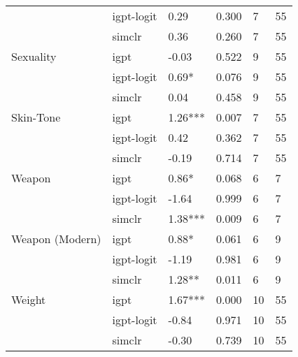 \begin{tabular}{llllll}
       & igpt-logit &     0.29 &  0.300 &     7 &    55 \\
       & simclr &     0.36 &  0.260 &     7 &    55 \\
Sexuality & igpt &    -0.03 &  0.522 &     9 &    55 \\
       & igpt-logit &    0.69* &  0.076 &     9 &    55 \\
       & simclr &     0.04 &  0.458 &     9 &    55 \\
Skin-Tone & igpt &  1.26*** &  0.007 &     7 &    55 \\
       & igpt-logit &     0.42 &  0.362 &     7 &    55 \\
       & simclr &    -0.19 &  0.714 &     7 &    55 \\
Weapon & igpt &    0.86* &  0.068 &     6 &     7 \\
       & igpt-logit &    -1.64 &  0.999 &     6 &     7 \\
       & simclr &  1.38*** &  0.009 &     6 &     7 \\
Weapon (Modern) & igpt &    0.88* &  0.061 &     6 &     9 \\
       & igpt-logit &    -1.19 &  0.981 &     6 &     9 \\
       & simclr &   1.28** &  0.011 &     6 &     9 \\
Weight & igpt &  1.67*** &  0.000 &    10 &    55 \\
       & igpt-logit &    -0.84 &  0.971 &    10 &    55 \\
       & simclr &    -0.30 &  0.739 &    10 &    55 \\
\bottomrule
\end{tabular}
